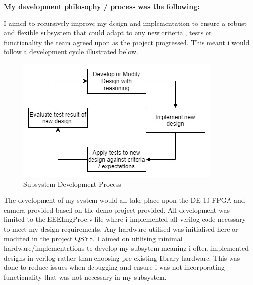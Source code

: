 \documentclass[10pt,twoside]{article}
\begin{document}
\textbf{My development philosophy / process was the following:}

I aimed to recursively improve my design and implementation to ensure a robust and flexible subsystem that could adapt to any new criteria , tests or functionality the team agreed upon as the project progressed. This meant i would follow a development cycle illustrated below.

\begin{figure}[hbt!]
    \centering
    \includegraphics[scale=0.60]{FlowOfDesign.jpg}
    \captionsetup{justification=centering}
    \caption{Subsystem Development Process}
\end{figure}

The development of my system would all take place upon the DE-10 FPGA and camera provided based on the demo project provided. All development was limited to the EEEImgProc.v file where i implemented all verilog code necessary to meet my design requirements. Any hardware utilised was initialised here or modified in the project QSYS. I aimed on utilising minimal hardware/implementations to develop  my subsytem meaning i often implemented designs in verilog rather than choosing pre-existing library hardware. This was done to reduce issues when debugging and ensure i was not incorporating functionality that was not necessary in my subsystem.




\newpage
\end{document}
